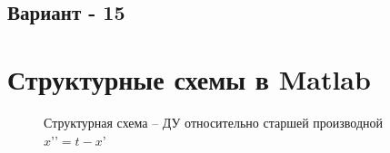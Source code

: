 \documentclass[12pt]{article}
\begin{document}
				\subsection{Вариант - 15}	
	\begin{figure}[h]
	\end{figure}	
			\clearpage
	\section{Структурные схемы в Matlab}
	
	\begin{figure}[h]
		\caption{Структурная схема -- ДУ относительно старшей производной $x’’=t-x’$}
	\end{figure}
\end{document}
